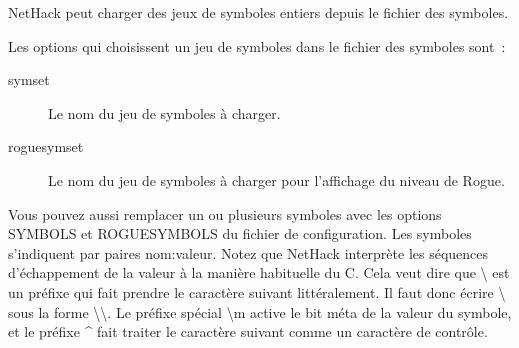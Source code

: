 \documentclass[titlepage]{article}
\begin{document}
NetHack peut charger des jeux de symboles entiers depuis le fichier des
symboles.


Les options qui choisissent un jeu de symboles dans le fichier des
symboles sont~:

\begin{description}
\item[{symset}]
Le nom du jeu de symboles à charger.

\item[{roguesymset}]
Le nom du jeu de symboles à charger pour l'affichage du niveau de Rogue.

\end{description}

Vous pouvez aussi remplacer un ou plusieurs symboles avec les options
SYMBOLS et ROGUESYMBOLS du fichier de configuration.
Les symboles s'indiquent par paires nom:valeur.
Notez que NetHack interprète les séquences d'échappement de la valeur à
la manière habituelle du C.
Cela veut dire que \textbackslash{} est un préfixe qui fait prendre le caractère suivant
littéralement.
Il faut donc écrire \textbackslash{} sous la forme \textbackslash{}\textbackslash{}.
Le préfixe spécial \textbackslash{}m active le bit méta de la valeur du symbole, et le
préfixe \textasciicircum{} fait traiter le caractère suivant comme un caractère de
contrôle.
\end{document}
